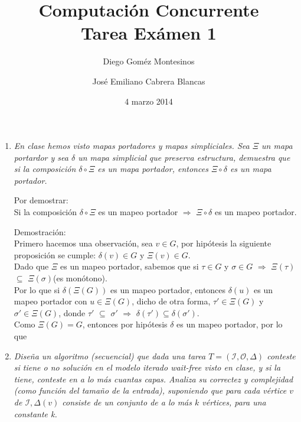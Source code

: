 \documentclass{article}
\title{Computación Concurrente \\ \Large{Tarea Exámen 1}}
\author{
  Diego Goméz Montesinos
  \and
  José Emiliano Cabrera Blancas
  }
\date{4 marzo 2014}
\begin{document}
\maketitle
\begin{enumerate}
  
\item{
    \textsl{
      En clase hemos visto mapas portadores y mapas simpliciales. Sea $\Xi$ un
      mapa portardor y sea $\delta$ un mapa simplicial que preserva estructura,
      demuestra que si la composición $\delta \circ \Xi$ es un mapa portador, 
      entonces $\Xi \circ \delta$ es un mapa portador.\\
    }
    
    Por demostrar:\\
    Si la composición $\delta \circ \Xi$ es un mapeo portador $\Rightarrow$ 
    $\Xi \circ \delta$ es un mapeo portador.
    
    Demostración:\\
    Primero hacemos una observación, sea $v \in G$, por hipótesis la siguiente 
    proposición se cumple: $\delta(v) \in G$ y $\Xi(v) \in G$.\\
    Dado que $\Xi$ es un mapeo portador, sabemos que si $\tau \in G$ y 
    $\sigma \in G$ $\Rightarrow$ $\Xi(\tau)$ $\subseteq$ $\Xi(\sigma)$(es monótono).\\
    Por lo que si $\delta(\Xi(G))$ es un mapeo portador, entonces $\delta(u)$ es un
    mapeo portador con $u \in \Xi(G)$, dicho de otra forma, $\tau' \in \Xi(G)$ y 
    $\sigma' \in \Xi(G)$, donde $\tau'$ $\subseteq$ $\sigma'$ $\Rightarrow$ $\delta(\tau') 
    \subseteq \delta(\sigma')$.\\
    Como $\Xi(G) = G$, entonces por hipótesis $\delta$ es un mapeo portador, por lo que 
    
  }
  
\item{
    \textsl{ 
      Diseña un algoritmo (secuencial) que dada una tarea $T = (\mathcal{I},\mathcal{O},\Delta)$
      conteste si tiene o no solución en el modelo iterado wait-free visto en clase, y si la tiene,
      conteste en a lo más cuantas capas. Analiza su correctez y complejidad (como función del tamaño
      de la entrada), suponiendo que para cada vértice $v$ de $\mathcal{I},\Delta(v)$ consiste de 
      un conjunto de a lo más $k$ vértices, para una constante k.
    }

}
\end{enumerate}
\end{document}
